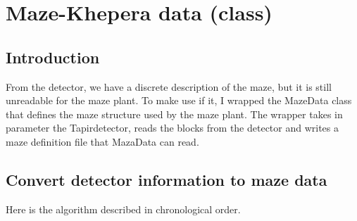 \section{Maze-Khepera data (class)}
\label{sec:mkd}

\subsection{Introduction}
\label{sec:mkd:intro}

From the detector, we have a discrete description of the maze, but it 
is still unreadable for the maze plant. To make use if it, I wrapped 
the MazeData class that defines the maze structure used by the maze 
plant. The wrapper takes in parameter the Tapirdetector, reads the blocks 
from the detector and writes a maze definition file that MazaData 
can read.

\subsection{Convert detector information to maze data}
\label{sec:mkd:algo}
Here is the algorithm described in chronological order.



